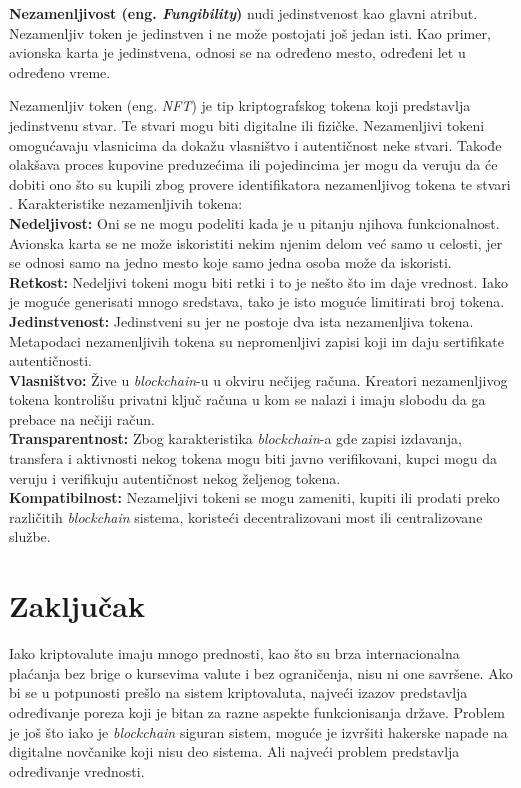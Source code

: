 \documentclass[a4paper]{article}
\begin{document}
{\textbf{Nezamenljivost (eng. \emph{Fungibility})} nudi jedinstvenost kao glavni atribut. Nezamenljiv token je jedinstven i ne može postojati još jedan isti. Kao primer, avionska karta je jedinstvena, odnosi se na određeno mesto, određeni let u određeno vreme.

Nezamenljiv token (eng. \emph{NFT}) je tip kriptografskog tokena koji predstavlja jedinstvenu stvar. Te stvari mogu biti digitalne ili fizičke. Nezamenljivi tokeni omogućavaju vlasnicima da dokažu vlasništvo i autentičnost neke stvari. Takođe olakšava proces kupovine preduzećima ili pojedincima jer mogu da veruju da će dobiti ono što su kupili zbog provere identifikatora nezamenljivog tokena te stvari \cite{nft}. Karakteristike nezamenljivih tokena:\\ 

\textbf{Nedeljivost:} Oni se ne mogu podeliti kada je u pitanju njihova funkcionalnost. Avionska karta se ne može iskoristiti nekim njenim delom već samo u celosti, jer se odnosi samo na jedno mesto koje samo jedna osoba može da iskoristi.\\ 

\textbf{Retkost:} Nedeljivi tokeni mogu biti retki i to je nešto što im daje vrednost. Iako je moguće generisati mnogo sredstava, tako je isto moguće limitirati broj tokena.\\

\textbf{Jedinstvenost:} Jedinstveni su jer ne postoje dva ista nezamenljiva tokena. Metapodaci nezamenljivih tokena su nepromenljivi zapisi koji im daju sertifikate autentičnosti.\\

\textbf{Vlasništvo:} Žive u \emph{blockchain}-u u okviru nečijeg računa. Kreatori nezamenljivog tokena kontrolišu privatni ključ računa u kom se nalazi i imaju slobodu da ga prebace na nečiji račun.\\

\textbf{Transparentnost:} Zbog karakteristika  \emph{blockchain}-a gde zapisi izdavanja, transfera i aktivnosti nekog tokena mogu biti javno verifikovani, kupci mogu da veruju i verifikuju autentičnost nekog željenog tokena.\\

\textbf{Kompatibilnost:} Nezameljivi tokeni se mogu zameniti, kupiti ili prodati preko različitih  \emph{blockchain} sistema, koristeći decentralizovani most ili centralizovane službe.


\newpage


\section{Zaključak}
\label{sec:zaključak}
Iako kriptovalute imaju mnogo prednosti, kao što su brza internacionalna plaćanja bez brige o kursevima valute i bez ograničenja, nisu ni one savršene. Ako bi se u potpunosti prešlo na sistem kriptovaluta, najveći izazov predstavlja određivanje poreza koji je bitan za razne aspekte funkcionisanja države. Problem je još što iako je  \emph{blockchain} siguran sistem, moguće je izvršiti hakerske napade na digitalne novčanike koji nisu deo sistema. Ali najveći problem predstavlja određivanje vrednosti.

}
\end{document}
